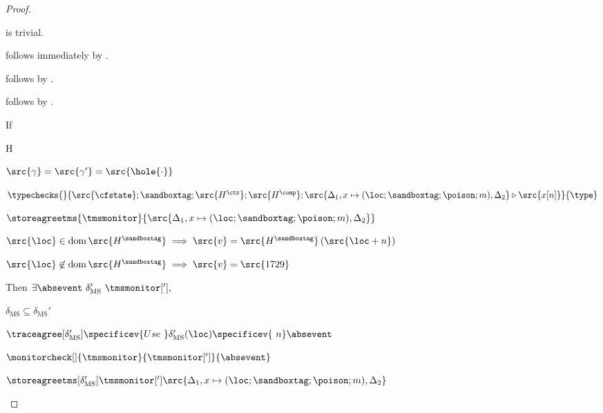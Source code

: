 \documentclass[a4paper,names,dvipsnames]{article}
\begin{document}
\begin{proof}
\begin{description}
       is trivial.

       follows immediately by .

       follows by .

       follows by .

      If
      \begin{passumptions}{H}
        \item $\src{\gamma}=\src{\gamma'}=\src{\hole{\cdot}}$
        \item $\typechecks{}{\src{\cfstate};\sandboxtag;\src{H^{\ctx}};\src{H^{\comp}};\src{\Delta_1,x\mapsto(\loc;\sandboxtag;\poison;m),\Delta_2}\triangleright\src{x[n]}}{\type}$
        \item $\storeagreetms{\tmsmonitor}{\src{\Delta_1,x\mapsto(\loc;\sandboxtag;\poison;m),\Delta_2}}$
        \item $\src{\loc}\in\operatorname{dom}\src{H^{\sandboxtag}}\implies \src{v}=\src{H^{\sandboxtag}}\left(\src{\loc+n}\right)$
        \item $\src{\loc}\not\in\operatorname{dom}\src{H^{\sandboxtag}}\implies \src{v}=\src{1729}$
      \end{passumptions}
      Then $\exists \absevent\ \delta_{\text{MS}}'\ \tmsmonitor['],$
      \begin{goals}
        \item $\delta_{\text{MS}}\subseteq\delta_{\text{MS}}'$
        \item $\traceagree[\delta_{\text{MS}}']{\specificev{Use\ }\delta_{\text{MS}}'(\loc)\specificev{\ n}}{\absevent}$
        \item $\monitorcheck[]{\tmsmonitor}{\tmsmonitor[']}{\absevent}$
        \item $\storeagreetms[\delta_{\text{MS}}']{\tmsmonitor[']}{\src{\Delta_1,x\mapsto(\loc;\sandboxtag;\poison;m),\Delta_2}}$
      \end{goals}


\end{description}
\end{proof}
\end{document}
